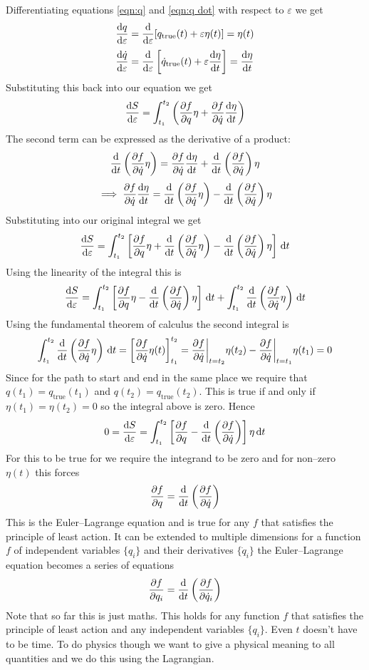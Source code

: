 \documentclass{article}
\begin{document}
    Differentiating equations \ref{eqn:q} and \ref{eqn:q dot} with respect to \(\varepsilon\) we get
    \[\dv{q}{\varepsilon} = \dv{\varepsilon}[q_\text{true}(t) + \varepsilon\eta(t)] = \eta(t)\]
    \[\dv{\dot q}{\varepsilon} = \dv{\varepsilon}\left[\dot q_\text{true}(t) + \varepsilon\dv{\eta}{t}\right] = \dv{\eta}{t}\]
    Substituting this back into our equation we get
    \[\dv{S}{\varepsilon} = \int_{t_1}^{t_2}\left(\pdv{f}{q}\eta + \pdv{f}{\dot q}\dv{\eta}{t}\right)\]
    The second term can be expressed as the derivative of a product:
    \[\dv{t}\left(\pdv{f}{\dot q}\eta\right) = \pdv{f}{\dot q}\dv{\eta}{t} + \dv{t}\left(\pdv{f}{\dot q}\right)\eta\]
    \[\implies \pdv{f}{\dot q}\dv{\eta}{t} = \dv{t}\left(\pdv{f}{\dot q}\eta\right) - \dv{t}\left(\pdv{f}{\dot q}\right)\eta\]
    Substituting into our original integral we get
    \[\dv{S}{\varepsilon} = \int_{t_1}^{t_2}\left[\pdv{f}{q}\eta + \dv{t}\left(\pdv{f}{\dot q}\eta\right) - \dv{t}\left(\pdv{f}{\dot q}\right)\eta\right] \,\dd t\]
    Using the linearity of the integral this is
    \[\dv{S}{\varepsilon} = \int_{t_1}^{t_2}\left[\pdv{f}{q}\eta - \dv{t}\left(\pdv{f}{\dot q}\right)\eta\right]\,\dd t + \int_{t_1}^{t_2} \dv{t}\left(\pdv{f}{\dot q}\eta\right)\,\dd t\]
    Using the fundamental theorem of calculus the second integral is
    \[\int_{t_1}^{t_2}\dv{t}\left(\pdv{f}{\dot q}\eta\right)\,\dd t = \left[\pdv{f}{\dot q}\eta(t)\right]_{t_1}^{t_2} = \pdv{f}{\dot q}\biggr|_{t = t_2}\eta(t_2) - \pdv{f}{\dot q}\biggr|_{t = t_1}\eta(t_1) = 0\]
    Since for the path to start and end in the same place we require that \(q(t_1) = q_\text{true}(t_1)\) and \(q(t_2) = q_\text{true}(t_2)\).
    This is true if and only if \(\eta(t_1) = \eta(t_2) = 0\) so the integral above is zero.
    Hence
    \[0 = \dv{S}{\varepsilon} = \int_{t_1}^{t_2}\left[\pdv{f}{q} - \dv{t}\left(\pdv{f}{\dot q}\right)\right]\eta\,\dd t\]
    For this to be true for we require the integrand to be zero and for non--zero \(\eta(t)\) this forces
    \[\pdv{f}{q} = \dv{t}\left(\pdv{f}{\dot q}\right)\]
    This is the Euler--Lagrange equation and is true for any \(f\) that satisfies the principle of least action.
    It can be extended to multiple dimensions for a function \(f\) of independent variables \(\{q_i\}\) and their derivatives \(\{\dot q_i\}\) the Euler--Lagrange equation becomes a series of equations
    \[\pdv{f}{q_i} = \dv{t}\left(\pdv{f}{\dot q_i}\right)\]
    Note that so far this is just maths.
    This holds for any function \(f\) that satisfies the principle of least action and any independent variables \(\{q_i\}\).
    Even \(t\) doesn't have to be time.
    To do physics though we want to give a physical meaning to all quantities and we do this using the Lagrangian.
    
\end{document}
